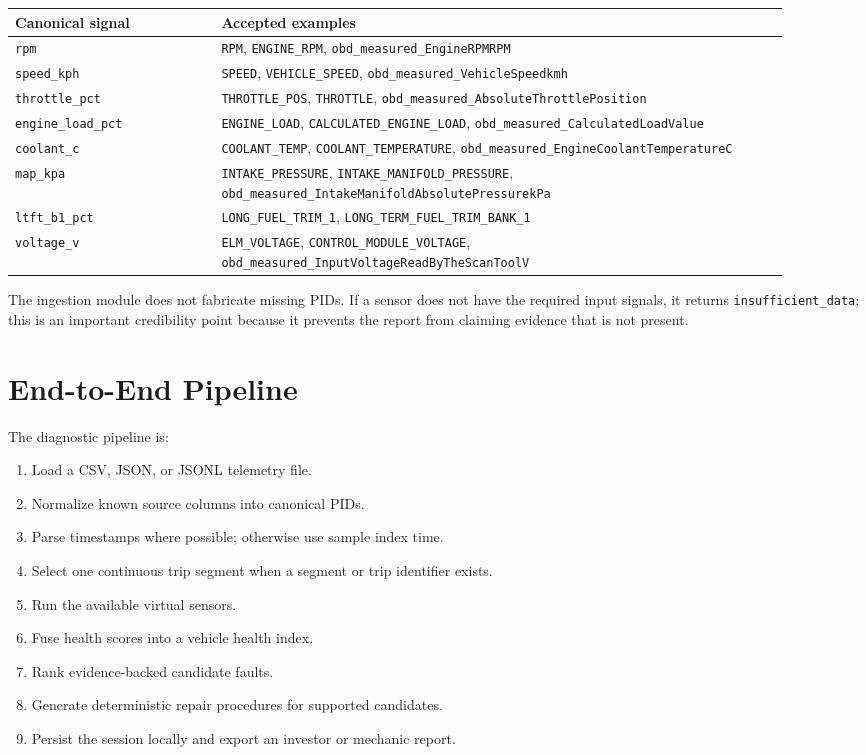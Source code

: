 \documentclass[11pt,a4paper]{article}
\begin{document}
\begin{longtable}{M{0.24\linewidth}M{0.66\linewidth}}
\toprule
\textbf{Canonical signal} & \textbf{Accepted examples} \\
\midrule
\texttt{rpm} & \texttt{RPM}, \texttt{ENGINE\_RPM}, \texttt{obd\_measured\_EngineRPMRPM} \\
\texttt{speed\_kph} & \texttt{SPEED}, \texttt{VEHICLE\_SPEED}, \texttt{obd\_measured\_VehicleSpeedkmh} \\
\texttt{throttle\_pct} & \texttt{THROTTLE\_POS}, \texttt{THROTTLE}, \texttt{obd\_measured\_AbsoluteThrottlePosition} \\
\texttt{engine\_load\_pct} & \texttt{ENGINE\_LOAD}, \texttt{CALCULATED\_ENGINE\_LOAD}, \texttt{obd\_measured\_CalculatedLoadValue} \\
\texttt{coolant\_c} & \texttt{COOLANT\_TEMP}, \texttt{COOLANT\_TEMPERATURE}, \texttt{obd\_measured\_EngineCoolantTemperatureC} \\
\texttt{map\_kpa} & \texttt{INTAKE\_PRESSURE}, \texttt{INTAKE\_MANIFOLD\_PRESSURE}, \texttt{obd\_measured\_IntakeManifoldAbsolutePressurekPa} \\
\texttt{ltft\_b1\_pct} & \texttt{LONG\_FUEL\_TRIM\_1}, \texttt{LONG\_TERM\_FUEL\_TRIM\_BANK\_1} \\
\texttt{voltage\_v} & \texttt{ELM\_VOLTAGE}, \texttt{CONTROL\_MODULE\_VOLTAGE}, \texttt{obd\_measured\_InputVoltageReadByTheScanToolV} \\
\bottomrule
\end{longtable}

The ingestion module does not fabricate missing PIDs. If a sensor does not have the required input signals, it returns \texttt{insufficient\_data}; this is an important credibility point because it prevents the report from claiming evidence that is not present.

\section{End-to-End Pipeline}

The diagnostic pipeline is:

\begin{enumerate}
\item Load a CSV, JSON, or JSONL telemetry file.
\item Normalize known source columns into canonical PIDs.
\item Parse timestamps where possible; otherwise use sample index time.
\item Select one continuous trip segment when a segment or trip identifier exists.
\item Run the available virtual sensors.
\item Fuse health scores into a vehicle health index.
\item Rank evidence-backed candidate faults.
\item Generate deterministic repair procedures for supported candidates.
\item Persist the session locally and export an investor or mechanic report.
\end{enumerate}
\end{document}

